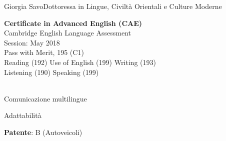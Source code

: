 \documentclass{article}
\begin{document}
\begin{cv}[avatar]{Giorgia Savo}{Dottoressa in Lingue, Civiltà Orientali e Culture Moderne}

\scriptsize \textbf{Certificate in Advanced English (CAE)}\\
Cambridge English Language Assessment\\
Session: May 2018\\
Pass with Merit, 195 (C1)\\
Reading (192) Use of English (199) Writing (193)\\Listening (190) Speaking (199)\\
\\
\normalsize
{}
\normalsize


\begin{cvitem}
    Comunicazione multilingue
\end{cvitem}

\cvseparator
\begin{cvitem}
    Adattabilità
\end{cvitem}


\begin{cvitem}
	\textbf{Patente}: B (Autoveicoli)
\end{cvitem}


\end{cv}

\end{document}
